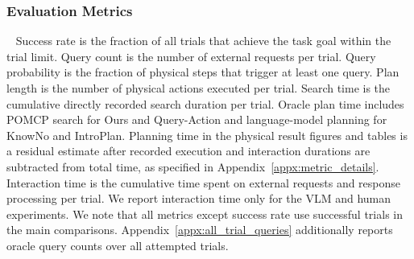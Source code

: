 \subsubsection{Evaluation Metrics}~\label{exp:metrics}
Success rate is the fraction of all trials that achieve the task goal within the trial limit. Query count is the number of external requests per trial. Query probability is the fraction of physical steps that trigger at least one query. Plan length is the number of physical actions executed per trial. Search time is the cumulative directly recorded search duration per trial. Oracle plan time includes POMCP search for Ours and Query-Action and language-model planning for KnowNo and IntroPlan. Planning time in the physical result figures and tables is a residual estimate after recorded execution and interaction durations are subtracted from total time, as specified in Appendix~\ref{appx:metric_details}. Interaction time is the cumulative time spent on external requests and response processing per trial. We report interaction time only for the VLM and human experiments. We note that all metrics except success rate use successful trials in the main comparisons. Appendix~\ref{appx:all_trial_queries} additionally reports oracle query counts over all attempted trials.
